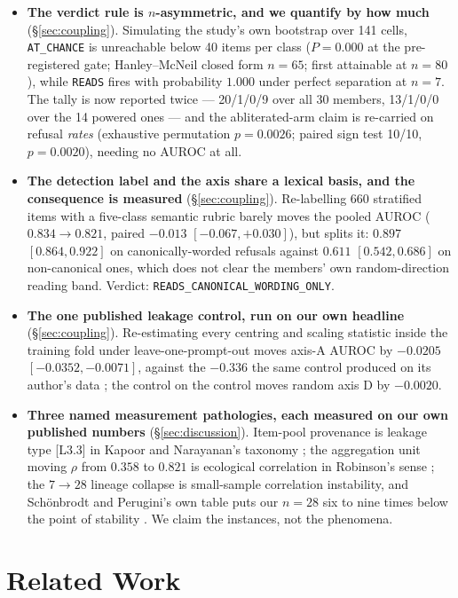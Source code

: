 \documentclass[11pt,letterpaper]{article}
\begin{document}
\begin{itemize}
\item \textbf{The verdict rule is \texorpdfstring{$n$}{n}-asymmetric, and we quantify by how much} (\S\ref{sec:coupling}). Simulating the study's own bootstrap over 141 cells, \texttt{AT\_CHANCE} is unreachable below 40 items per class ($P = 0.000$ at the pre-registered gate; Hanley--McNeil closed form $n = 65$; first attainable at $n = 80$), while \texttt{READS} fires with probability $1.000$ under perfect separation at $n = 7$. The tally is now reported twice --- 20/1/0/9 over all 30 members, 13/1/0/0 over the 14 powered ones --- and the abliterated-arm claim is re-carried on refusal \emph{rates} (exhaustive permutation $p = 0.0026$; paired sign test 10/10, $p = 0.0020$), needing no AUROC at all.
\item \textbf{The detection label and the axis share a lexical basis, and the consequence is measured} (\S\ref{sec:coupling}). Re-labelling 660 stratified items with a five-class semantic rubric barely moves the pooled AUROC ($0.834 \to 0.821$, paired $-0.013$ $[-0.067, +0.030]$), but splits it: $0.897$ $[0.864, 0.922]$ on canonically-worded refusals against $0.611$ $[0.542, 0.686]$ on non-canonical ones, which does not clear the members' own random-direction reading band. Verdict: \texttt{READS\_CANONICAL\_WORDING\_ONLY}.
\item \textbf{The one published leakage control, run on our own headline} (\S\ref{sec:coupling}). Re-estimating every centring and scaling statistic inside the training fold under leave-one-prompt-out moves axis-A AUROC by $-0.0205$ $[-0.0352, -0.0071]$, against the $-0.336$ the same control produced on its author's data \citep{Mehta2026}; the control on the control moves random axis D by $-0.0020$.
\item \textbf{Three named measurement pathologies, each measured on our own published numbers} (\S\ref{sec:discussion}). Item-pool provenance is leakage type [L3.3] in Kapoor and Narayanan's taxonomy \citep{Kapoor2023}; the aggregation unit moving $\rho$ from $0.358$ to $0.821$ is ecological correlation in Robinson's sense \citep{Robinson1950}; the $7\to28$ lineage collapse is small-sample correlation instability, and Sch\"onbrodt and Perugini's own table puts our $n = 28$ six to nine times below the point of stability \citep{Schonbrodt2013,Schonbrodt2018}. We claim the instances, not the phenomena.
\end{itemize}

\section{Related Work}
\label{sec:related}
\end{document}
